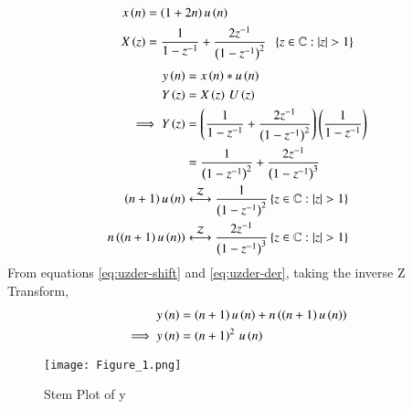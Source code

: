 \documentclass[journal,12pt,twocolumn]{IEEEtran}
\theoremstyle{remark}
\begin{document}
\begin{align}
    x\brak{n}&= \brak{1+2n}u\brak{n}\\
    X\brak{z}&=\frac{1}{1-z^{-1}}+\frac{2z^{-1}}{\brak{1-z^{-1}}^2}\;\;\cbrak{z\in\mathbb{C}: |z|>1}
\end{align}
\begin{align}
   y\brak{n}&=x\brak{n}*u\brak{n}\\
   Y\brak{z}&=X\brak{z}\,U\brak{z}\\
   \implies Y\brak{z}&=\brak{\frac{1}{1-z^{-1}}+\frac{2z^{-1}}{\brak{1-z^{-1}}^2}}\brak{\frac{1}{1-z^{-1}}}\\
   &=\frac{1}{\brak{1-z^{-1}}^2}+\frac{2z^{-1}}{\brak{1-z^{-1}}^3}\\
   \brak{n+1}u\brak{n}&\system{Z}\frac{1}{\brak{1-z^{-1}}^2}\cbrak{z\in\mathbb{C}: |z|>1}\\
   n\brak{\brak{n+1}u\brak{n}}&\system{Z}\frac{2z^{-1}}{\brak{1-z^{-1}}^3}\cbrak{z\in\mathbb{C}: |z|>1}
\end{align}
   From equations \eqref{eq:uzder-shift} and \eqref{eq:uzder-der}, taking the inverse Z Transform,
   \begin{align}
   y\left(n\right)&=\left(n+1\right)u\left(n\right)+n\left(\left(n+1\right)u\left(n\right)\right)\\
   \implies y\left(n\right)&=\left(n+1\right)^2\,u\left(n\right)
\end{align}
\begin{figure}[h!]
   \centering
   \texttt{[image: Figure\_1.png]}
   \caption{Stem Plot of y}
   \label{stemplot}
\end{figure}
\end{document}

